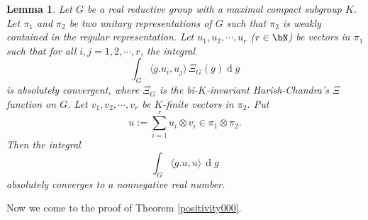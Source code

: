 \documentclass[12pt,a4paper]{amsart}
\newcommand{\od}{\operatorname{d}}
\newcommand{\la}{\langle}
\newcommand{\ra}{\rangle}
\numberwithin{equation}{section}
\newtheorem{lem}[thm]{Lemma}
\theoremstyle{remark}
\begin{document}
\begin{lem}\label{positivity}
Let $G$ be a real reductive group with a maximal compact subgroup $K$. Let $\pi_1$ and $\pi_2$ be two unitary representations of $G$ such that $\pi_2$ is weakly
contained in the regular representation. Let $u_1, u_2, \cdots, u_r$ ($r\in \bN$) be vectors in $\pi_1$ such that for all $i,j=1,2, \cdots, r$,
the integral
\[
  \int_G \la g. u_i, u_j\ra\,\Xi_G (g) \od\!g %
\]
is absolutely convergent, where  $\Xi_G$ is the bi-$K$-invariant Harish-Chandra's $\Xi$ function on $G$.   Let $v_1,v_2,\cdots, v_r$ be  $K$-finite vectors in $\pi_2$. 
Put
\[
u:=\sum_{i=1}^r u_i\otimes v_i\in \pi_1\otimes \pi_2.
\]
Then the integral
\[%
\int_G \la g. u,u \rangle\,\od\! g
\]%
absolutely converges to a nonnegative real number.
\end{lem}


Now we come to the proof of Theorem \ref{positivity000}.


\end{document}
